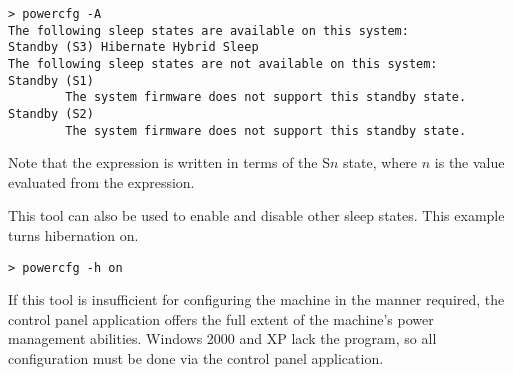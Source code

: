 \begin{verbatim}
> powercfg -A
The following sleep states are available on this system: 
Standby (S3) Hibernate Hybrid Sleep
The following sleep states are not available on this system:
Standby (S1)
        The system firmware does not support this standby state.
Standby (S2)
        The system firmware does not support this standby state.
\end{verbatim}

Note that the  expression is written in terms of the 
S$n$ state, where $n$ is the value evaluated from the expression.

This tool can also be used to enable and disable other sleep states.
This example turns hibernation on.

\begin{verbatim}
> powercfg -h on
\end{verbatim}

If this tool is insufficient for configuring the machine in the manner required,
the  control panel application offers
the full extent of the machine's power management abilities.
Windows 2000 and XP lack the  program,
so all configuration must be done via the 
control panel application.

